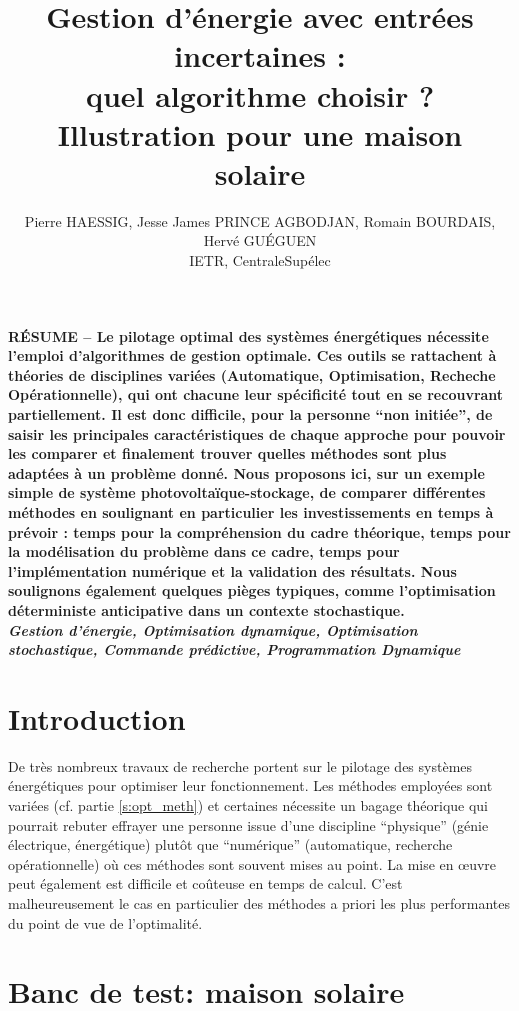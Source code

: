 \documentclass[a4paper,10pt,twocolumn]{article}
\title{
\fontsize{24pt}{24pt}\selectfont
Gestion d'énergie avec entrées incertaines : \\
quel algorithme choisir ?\\
Illustration pour une maison solaire
}
\author{
\fontsize{11pt}{11pt}\selectfont
Pierre HAESSIG\tsp{*}, Jesse James PRINCE AGBODJAN\tsp{*}, Romain BOURDAIS\tsp{*}, Hervé GUÉGUEN\tsp{*}\\
\fontsize{10pt}{10pt}\selectfont
\tsp{*}IETR, CentraleSupélec
}
\date{}
\begin{document}
\maketitle
\thispagestyle{fancy}


\fontsize{9pt}{9pt}\selectfont
\textbf{RÉSUME --
Le pilotage optimal des systèmes énergétiques nécessite l'emploi d'algorithmes
de gestion optimale.
Ces outils se rattachent à théories de disciplines variées (Automatique, Optimisation, Recheche Opérationnelle),
qui ont chacune leur spécificité tout en se recouvrant partiellement.
%
Il est donc difficile, pour la personne ``non initiée'', de saisir les principales caractéristiques
de chaque approche pour pouvoir les comparer et finalement trouver
quelles méthodes sont plus adaptées à un problème donné.
%
Nous proposons ici, sur un exemple simple de système photovoltaïque-stockage, de
comparer différentes méthodes en soulignant en particulier les investissements
en temps à prévoir :
temps pour la compréhension du cadre théorique,
temps pour la modélisation du problème dans ce cadre,
temps pour l'implémentation numérique et la validation des résultats.
Nous soulignons également quelques pièges typiques, comme l'optimisation
déterministe anticipative dans un contexte stochastique.
}\\

\textbf{\textit{Gestion d'énergie, Optimisation dynamique, Optimisation stochastique,
Commande prédictive, Programmation Dynamique}}

\fontsize{10pt}{10pt}\selectfont


\section{Introduction}

De très nombreux travaux de recherche portent sur le pilotage des systèmes énergétiques
pour optimiser leur fonctionnement.
Les méthodes employées sont variées (cf. partie \ref{s:opt_meth})
et certaines nécessite un bagage théorique qui pourrait rebuter effrayer
une personne issue d'une discipline ``physique'' (génie électrique, énergétique)
plutôt que ``numérique'' (automatique, recherche opérationnelle) où ces méthodes
sont souvent mises au point.
La mise en œuvre peut également est difficile et coûteuse en temps de calcul.
C'est malheureusement le cas en particulier des méthodes
a priori les plus performantes du point de vue de l'optimalité.


\section{Banc de test: maison solaire}
\end{document}
